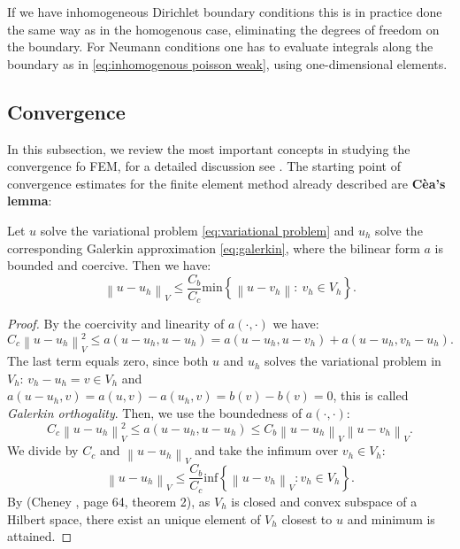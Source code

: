\documentclass[../Main/main.tex]{subfiles}
\begin{document}
	\begin{remark}
		If we have inhomogeneous Dirichlet boundary conditions this is in practice done the same way as in the homogenous case, eliminating the degrees of freedom on the boundary. For Neumann conditions one has to evaluate integrals along the boundary as in \eqref{eq:inhomogenous poisson weak}, using one-dimensional elements.
	\end{remark}
	\subsection{Convergence}\label{sec:convergence}

	
	In this subsection, we review the most important concepts in studying the convergence fo FEM, for a detailed discussion see \cite{Knabner}.
	The starting point of convergence estimates for the finite element method already described are \textbf{Cèa's lemma}:
	\begin{theorem}\label{lemma:cea}
		Let $u$ solve the variational problem \eqref{eq:variational problem} and $u_h$ solve the corresponding Galerkin approximation \eqref{eq:galerkin}, where the bilinear form $a$ is bounded and coercive. Then we have:
		\begin{equation}
			\left \| u-u_h \right \|_V \leq \frac{C_b}{C_c}\text{min} \left \{ \left \| u-v_h \right \|: \ v_h \in V_h \right \}.
		\end{equation}
		
	\end{theorem}
	\begin{proof}
		By the coercivity and linearity of $a(\cdot,\cdot)$ we have:
		\begin{equation*}
			C_c \left \| u-u_h \right \|^2_V \leq a(u-u_h,u-u_h) = a(u-u_h,u-v_h) + a(u-u_h, v_h - u_h).
		\end{equation*}
		The last term equals zero, since both $u$ and $u_h$ solves the variational problem in $V_h$: $v_h-u_h = v \in V_h$ and $a(u-u_h,v) = a(u,v)-a(u_h,v) = b(v)-b(v) = 0$, this is called \emph{Galerkin orthogality}. Then, we use the boundedness of $a(\cdot,\cdot)$:
		\begin{equation*}
			C_c \left \| u-u_h \right \|^2_V \leq a(u-u_h,u-u_h) \leq C_b \left \| u-u_h \right \|_V \left \| u-v_h \right \|_V.
		\end{equation*}
		We divide by $C_c$ and $\left \| u-u_h \right \|_V$ and take the infimum over $v_h \in V_h$:
		\begin{equation*}
			\left \| u-u_h \right \|_V \leq \frac{C_b}{C_c} \text{inf} \left \{ \left \| u-v_h \right \|_V: v_h \in V_h \right \}.
		\end{equation*}
		By (Cheney \cite{Cheney}, page 64, theorem 2), as $V_h$ is closed and convex subspace of a Hilbert space, there exist an unique element of $V_h$ closest to $u$ and minimum is attained.  
	\end{proof}
\end{document}

